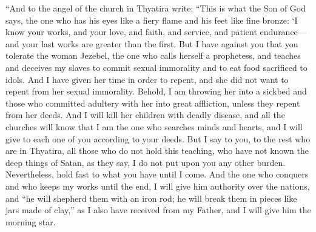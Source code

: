 \begin{biblechapter}
 “And to the angel of the church in Thyatira write:
\verse “This is what the Son of God says, the one who has his eyes like a fiery flame and his feet like fine bronze:
\verse ‘I know your works, and your love, and faith, and service, and patient endurance—and your last works are greater than the first.
\verse But I have against you that you tolerate the woman Jezebel, the one who calls herself a prophetess, and teaches and deceives my slaves to commit sexual immorality and to eat food sacrificed to idols.
\verse And I have given her time in order to repent, and she did not want to repent from her sexual immorality.
\verse Behold, I am throwing her into a sickbed and those who committed adultery with her into great affliction, unless they repent from her deeds.
\verse And I will kill her children with deadly disease, and all the churches will know that I am the one who searches minds and hearts, and I will give to each one of you according to your deeds.
\verse But I say to you, to the rest who are in Thyatira, all those who do not hold this teaching, who have not known the deep things of Satan, as they say, I do not put upon you any other burden.
\verse Nevertheless, hold fast to what you have until I come.
\verse And the one who conquers and who keeps my works until the end, I will give him authority over the nations,
\verse and “he will shepherd them with an iron rod; he will break them in pieces like jars made of clay,”
\verse as I also have received from my Father, and I will give him the morning star.
\end{biblechapter}


